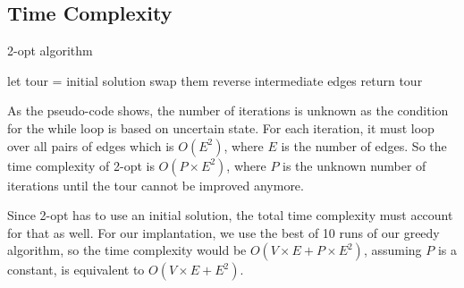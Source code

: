 \documentclass[12pt]{report}
\begin{document}
\subsection{Time Complexity}
\begin{algorithm}
\caption{2-opt algorithm}
\label{2opt_Alg}
\begin{algorithmic}[1]
    \State let tour = initial solution
    \State swap them
    \State reverse intermediate edges
    \EndIf
    \EndFor
    \EndWhile
    \State return tour
\EndProcedure
\end{algorithmic}
\end{algorithm}

\begin{multicols}{2}
    As the pseudo-code shows, the number of iterations is unknown as the condition for the while loop is based on uncertain state. For each iteration, it must loop over all pairs of edges which is $O(E^2)$, where $E$ is the number of edges. So the time complexity of 2-opt is $O(P \times E^2)$, where $P$ is the unknown number of iterations until the tour cannot be improved anymore.

    Since 2-opt has to use an initial solution, the total time complexity must account for that as well. For our implantation, we use the best of 10 runs of our greedy algorithm, so the time complexity would be $O(V \times E + P \times E^2)$, assuming $P$ is a constant, is equivalent to $O(V \times E + E^2)$.
\end{multicols}

% 
%
\end{document}

